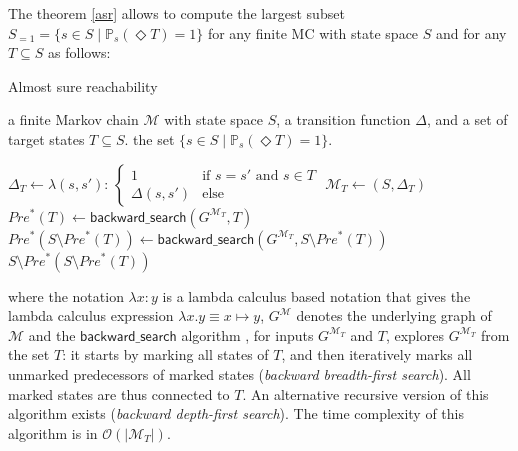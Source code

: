 The theorem \ref{asr} allows to compute the largest subset $S_{=1} = \{s \in S \; | \; \mathbb{P}_s(\Diamond T) = 1 \}$ for any finite MC with state space $S$ and for any $T \subseteq S$ as follows:
\begin{algorithm}[H]
\caption{Almost sure reachability}\label{almost-sure-algo}
\begin{algorithmic}[1]
  \REQUIRE a finite Markov chain $\mathcal{M}$ with state space $S$, a transition function $\Delta$, and a set of target states $T \subseteq S$.
  \ENSURE the set $\{ s \in S \; | \; \mathbb{P}_s(\Diamond T) = 1\}$.
  \item[]
  \STATE $\Delta_T \leftarrow \lambda (s, s'):\, \begin{cases}
    1 &\text{if } s = s' \text{ and } s \in T\\
    \Delta(s, s') &\text{else}
  \end{cases}$
  \STATE $\mathcal{M}_T \leftarrow (S, \Delta_T)$
  \STATE $Pre^*(T) \leftarrow \mathsf{backward\_search}(G^{\mathcal{M}_T}, T)$
  \STATE $Pre^*(S \setminus Pre^*(T)) \leftarrow \mathsf{backward\_search}(G^{\mathcal{M}_T}, S \setminus Pre^*(T))$
  \RETURN $S \setminus Pre^*(S \setminus Pre^*(T))$
\end{algorithmic}
\end{algorithm}
\noindent where the notation $\lambda x:y$ is a lambda calculus based notation that gives the lambda calculus expression $\lambda x.y \equiv x \mapsto y$, $G^\mathcal{M}$ denotes the underlying graph of $\mathcal{M}$ and the $\mathsf{backward\_search}$ algorithm
, for inputs $G^{\mathcal{M}_T}$ and $T$, explores $G^{\mathcal{M}_T}$ from the set $T$: it starts by marking all states of $T$, and then iteratively marks all unmarked predecessors of marked states (\textit{backward breadth-first search}). All marked states are thus connected to $T$. An alternative recursive version of this algorithm exists (\textit{backward depth-first search}).
The time complexity of this algorithm is in $\mathcal{O}(|\mathcal{M}_T|)$.

